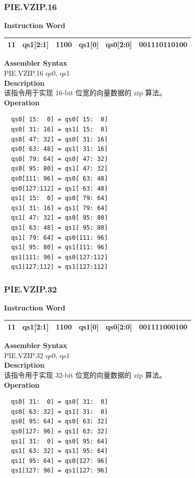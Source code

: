 \newpage
\subsubsection{PIE.VZIP.16}\label{instruction:PIEVZIP16}
\setlength\tabcolsep{6pt}
\textbf{Instruction Word} \\
\begin{tabular}{|c|c|c|c|c|c|}
	\hline
	11 & qs1[2:1] & 1100 & qs1[0] & qs0[2:0] & 001110110100 \\
	\hline
\end{tabular}

\textbf{Assembler Syntax} \\
PIE.VZIP.16 qs0, qs1 \\
\textbf{Description} \\
该指令用于实现 16-bit 位宽的向量数据的 zip 算法。\\
\textbf{Operation}
\begin{lstlisting}
  qs0[ 15:  0] = qs0[ 15:  0]
  qs0[ 31: 16] = qs1[ 15:  0]
  qs0[ 47: 32] = qs0[ 31: 16]
  qs0[ 63: 48] = qs1[ 31: 16]
  qs0[ 79: 64] = qs0[ 47: 32]
  qs0[ 95: 80] = qs1[ 47: 32]
  qs0[111: 96] = qs0[ 63: 48]
  qs0[127:112] = qs1[ 63: 48]
  qs1[ 15:  0] = qs0[ 79: 64]
  qs1[ 31: 16] = qs1[ 79: 64]
  qs1[ 47: 32] = qs0[ 95: 80]
  qs1[ 63: 48] = qs1[ 95: 80]
  qs1[ 79: 64] = qs0[111: 96]
  qs1[ 95: 80] = qs1[111: 96]
  qs1[111: 96] = qs0[127:112]
  qs1[127:112] = qs1[127:112]
\end{lstlisting}

\newpage
\subsubsection{PIE.VZIP.32}\label{instruction:PIEVZIP32}
\setlength\tabcolsep{6pt}
\textbf{Instruction Word} \\
\begin{tabular}{|c|c|c|c|c|c|}
	\hline
	11 & qs1[2:1] & 1100 & qs1[0] & qs0[2:0] & 001111000100 \\
	\hline
\end{tabular}

\textbf{Assembler Syntax} \\
PIE.VZIP.32 qs0, qs1 \\
\textbf{Description} \\
该指令用于实现 32-bit 位宽的向量数据的 zip 算法。\\
\textbf{Operation}
\begin{lstlisting}
  qs0[ 31:  0] = qs0[ 31:  0]
  qs0[ 63: 32] = qs1[ 31:  0]
  qs0[ 95: 64] = qs0[ 63: 32]
  qs0[127: 96] = qs1[ 63: 32]
  qs1[ 31:  0] = qs0[ 95: 64]
  qs1[ 63: 32] = qs1[ 95: 64]
  qs1[ 95: 64] = qs0[127: 96]
  qs1[127: 96] = qs1[127: 96]
\end{lstlisting}

